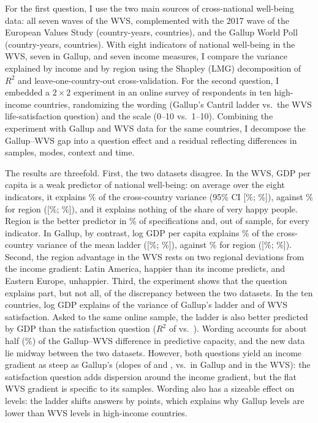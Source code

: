 \documentclass[12pt]{article}
\begin{document}
For the first question, I use the two main sources of cross-national well-being data: all seven waves of the WVS, complemented with the 2017 wave of the European Values Study (\nWVSCountryYears country-years, \nWVSCountries countries), and the Gallup World Poll (\nGallupCountryYears country-years, \nGallupCountries countries). With eight indicators of national well-being in the WVS, seven in Gallup, and seven income measures, I compare the variance explained by income and by region using the Shapley (LMG) decomposition of $R^2$ \citep{lindeman_introduction_1980,gromping_estimators_2007} and leave-one-country-out cross-validation.
For the second question, I embedded a $2 \times 2$ experiment in an online survey of \nFabre respondents in ten high-income countries, randomizing the wording (Gallup's Cantril ladder vs.\ the WVS life-satisfaction question) and the scale (0--10 vs.\ 1--10). Combining the experiment with Gallup and WVS data for the same countries, I decompose the Gallup--WVS gap into a question effect and a residual reflecting differences in samples, modes, context and time.

The results are threefold. First, the two datasets disagree. In the WVS, GDP per capita is a weak predictor of national well-being: on average over the eight indicators, it explains \meanRtwoIncomePPP\% of the cross-country variance (95\% CI [\ciLowWVSMeanRIncome\%; \ciHighWVSMeanRIncome\%]), against \meanRtwoRegion\% for region ([\ciLowWVSMeanRRegion\%; \ciHighWVSMeanRRegion\%]), and it explains nothing of the share of very happy people. Region is the better predictor in \shareRegionBetterWVS\% of specifications and, out of sample, for every indicator. In Gallup, by contrast, log GDP per capita explains \RtwoGallupMeanPPP\% of the cross-country variance of the mean ladder ([\ciLowGallupRIncome\%; \ciHighGallupRIncome\%]), against \RtwoGallupRegion\% for region ([\ciLowGallupRRegion\%; \ciHighGallupRRegion\%]). Second, the region advantage in the WVS rests on two regional deviations from the income gradient: Latin America, happier than its income predicts, and Eastern Europe, unhappier. Third, the experiment shows that the question explains part, but not all, of the discrepancy between the two datasets. In the ten countries, log GDP explains \RtwoTenGallup of the variance of Gallup's ladder and \RtwoTenWVS of WVS satisfaction. Asked to the same online sample, the ladder is also better predicted by GDP than the satisfaction question ($R^2$ of \RtwoTenFabreLadderPooled vs.\ \RtwoTenFabreSatisfactionPooled). Wording accounts for about half (\decompShareRWordingPooledPct\%) of the Gallup--WVS difference in predictive capacity, and the new data lie midway between the two datasets. However, both questions yield an income gradient as steep as Gallup's (slopes of \slopeTenFabreLadderPooled and \slopeTenFabreSatisfactionPooled, vs.\ \slopeTenGallup in Gallup and \slopeTenWVS in the WVS): the satisfaction question adds dispersion around the income gradient, but the flat WVS gradient is specific to its samples. Wording also has a sizeable effect on levels: the ladder shifts answers by \effectLadder points, which explains why Gallup levels are lower than WVS levels in high-income countries.
\end{document}
